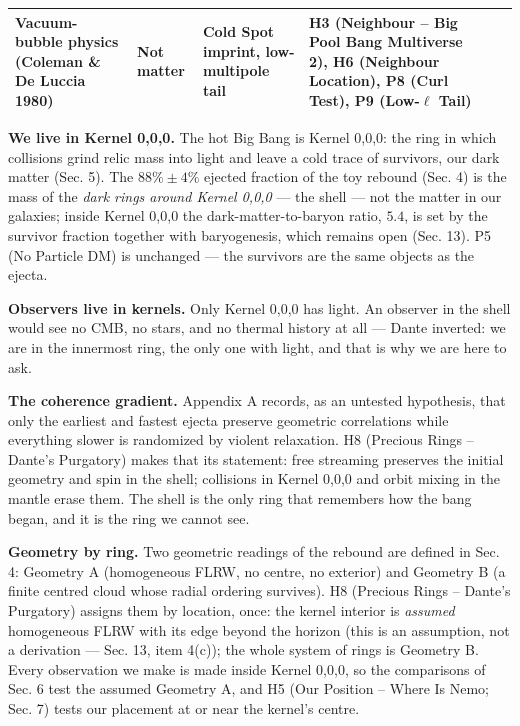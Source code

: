 \documentclass[
  11pt,
]{article}
\begin{document}
\begin{longtable}[]{@{}llllll@{}}
\begin{minipage}[t]{0.14\columnwidth}
Vacuum-bubble physics (Coleman \& De Luccia 1980)\strut
\end{minipage} & \begin{minipage}[t]{0.14\columnwidth}\raggedright
Not matter\strut
\end{minipage} & \begin{minipage}[t]{0.14\columnwidth}\raggedright
Cold Spot imprint, low-multipole tail\strut
\end{minipage} & \begin{minipage}[t]{0.14\columnwidth}\raggedright
H3 (Neighbour -- Big Pool Bang Multiverse 2), H6 (Neighbour Location),
P8 (Curl Test), P9 (Low-\(\ell\) Tail)\strut
\end{minipage}\tabularnewline
\bottomrule
\end{longtable}

\textbf{We live in Kernel 0,0,0.} The hot Big Bang is Kernel 0,0,0: the
ring in which collisions grind relic mass into light and leave a cold
trace of survivors, our dark matter (Sec. 5). The \(88\% \pm 4\%\)
ejected fraction of the toy rebound (Sec. 4) is the mass of the
\emph{dark rings around Kernel 0,0,0} --- the shell --- not the matter
in our galaxies; inside Kernel 0,0,0 the dark-matter-to-baryon ratio,
\(5.4\), is set by the survivor fraction together with baryogenesis,
which remains open (Sec. 13). P5 (No Particle DM) is unchanged --- the
survivors are the same objects as the ejecta.

\textbf{Observers live in kernels.} Only Kernel 0,0,0 has light. An
observer in the shell would see no CMB, no stars, and no thermal history
at all --- Dante inverted: we are in the innermost ring, the only one
with light, and that is why we are here to ask.

\textbf{The coherence gradient.} Appendix A records, as an untested
hypothesis, that only the earliest and fastest ejecta preserve geometric
correlations while everything slower is randomized by violent
relaxation. H8 (Precious Rings -- Dante's Purgatory) makes that its
statement: free streaming preserves the initial geometry and spin in the
shell; collisions in Kernel 0,0,0 and orbit mixing in the mantle erase
them. The shell is the only ring that remembers how the bang began, and
it is the ring we cannot see.

\textbf{Geometry by ring.} Two geometric readings of the rebound are
defined in Sec. 4: Geometry A (homogeneous FLRW, no centre, no exterior)
and Geometry B (a finite centred cloud whose radial ordering survives).
H8 (Precious Rings -- Dante's Purgatory) assigns them by location, once:
the kernel interior is \emph{assumed} homogeneous FLRW with its edge
beyond the horizon (this is an assumption, not a derivation --- Sec. 13,
item 4(c)); the whole system of rings is Geometry B. Every observation
we make is made inside Kernel 0,0,0, so the comparisons of Sec. 6 test
the assumed Geometry A, and H5 (Our Position -- Where Is Nemo; Sec. 7)
tests our placement at or near the kernel's centre.
\end{document}
